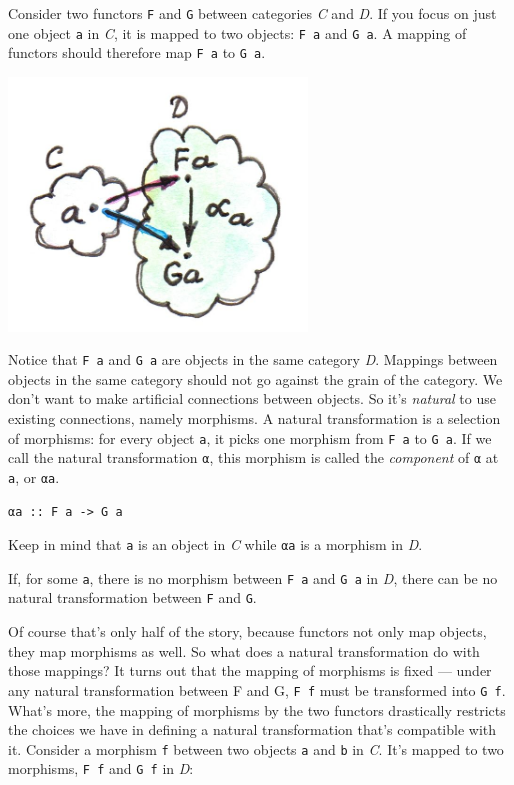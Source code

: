 Consider two functors \texttt{F} and \texttt{G} between categories
\emph{C} and \emph{D}. If you focus on just one object \texttt{a} in
\emph{C}, it is mapped to two objects: \texttt{F\ a} and \texttt{G\ a}.
A mapping of functors should therefore map \texttt{F\ a} to
\texttt{G\ a}.

\includegraphics[width=3.12500in]{images/2_natcomp.jpg}

Notice that \texttt{F\ a} and \texttt{G\ a} are objects in the same
category \emph{D}. Mappings between objects in the same category should
not go against the grain of the category. We don't want to make
artificial connections between objects. So it's \emph{natural} to use
existing connections, namely morphisms. A natural transformation is a
selection of morphisms: for every object \texttt{a}, it picks one
morphism from \texttt{F\ a} to \texttt{G\ a}. If we call the natural
transformation \texttt{α}, this morphism is called the \emph{component}
of \texttt{α} at \texttt{a}, or \texttt{αa}.

\begin{verbatim}
αa :: F a -> G a
\end{verbatim}

Keep in mind that \texttt{a} is an object in \emph{C} while \texttt{αa}
is a morphism in \emph{D}.

If, for some \texttt{a}, there is no morphism between \texttt{F\ a} and
\texttt{G\ a} in \emph{D}, there can be no natural transformation
between \texttt{F} and \texttt{G}.

Of course that's only half of the story, because functors not only map
objects, they map morphisms as well. So what does a natural
transformation do with those mappings? It turns out that the mapping of
morphisms is fixed --- under any natural transformation between F and G,
\texttt{F\ f} must be transformed into \texttt{G\ f}. What's more, the
mapping of morphisms by the two functors drastically restricts the
choices we have in defining a natural transformation that's compatible
with it. Consider a morphism \texttt{f} between two objects \texttt{a}
and \texttt{b} in \emph{C}. It's mapped to two morphisms, \texttt{F\ f}
and \texttt{G\ f} in \emph{D}:

